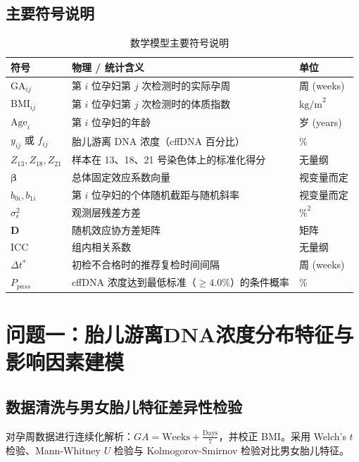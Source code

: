 ﻿\documentclass[12pt,a4paper]{article}
\begin{document}
\subsection{主要符号说明}
\begin{table}[H]
\centering
\caption{数学模型主要符号说明}
\begin{tabular}{lll}
\toprule
符号 & 物理 / 统计含义 & 单位 \\
\midrule
$\text{GA}_{ij}$ & 第 $i$ 位孕妇第 $j$ 次检测时的实际孕周 & 周 (weeks) \\
$\text{BMI}_{ij}$ & 第 $i$ 位孕妇第 $j$ 次检测时的体质指数 & $\text{kg/m}^2$ \\
$\text{Age}_i$ & 第 $i$ 位孕妇的年龄 & 岁 (years) \\
$y_{ij}$ 或 $f_{ij}$ & 胎儿游离 DNA 浓度（cffDNA 百分比） & $\%$ \\
$Z_{13}, Z_{18}, Z_{21}$ & 样本在 13、18、21 号染色体上的标准化得分 & 无量纲 \\
$\boldsymbol{\beta}$ & 总体固定效应系数向量 & 视变量而定 \\
$b_{0i}, b_{1i}$ & 第 $i$ 位孕妇的个体随机截距与随机斜率 & 视变量而定 \\
$\sigma_\epsilon^2$ & 观测层残差方差 & $\%^2$ \\
$\mathbf{D}$ & 随机效应协方差矩阵 & 矩阵 \\
$\text{ICC}$ & 组内相关系数 & 无量纲 \\
$\Delta t^*$ & 初检不合格时的推荐复检时间间隔 & 周 (weeks) \\




$P_{pass}$ & cffDNA 浓度达到最低标准（$\ge 4.0\%$）的条件概率 & $\%$ \\
\bottomrule
\end{tabular}
\end{table}


\section{问题一：胎儿游离DNA浓度分布特征与影响因素建模}


\subsection{数据清洗与男女胎儿特征差异性检验}
对孕周数据进行连续化解析：$GA = \text{Weeks} + \frac{\text{Days}}{7}$，并校正 BMI。采用 Welch's $t$ 检验、Mann-Whitney $U$ 检验与 Kolmogorov-Smirnov 检验对比男女胎儿特征。
\end{document}
